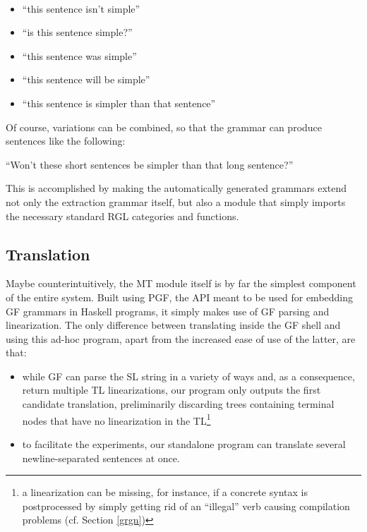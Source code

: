 \begin{example} \
    \begin{itemize}
        \item ``this sentence isn't simple''
        \item ``is this sentence simple?''
        \item ``this sentence was simple''
        \item ``this sentence will be simple''
        \item ``this sentence is simpler than that sentence''
    \end{itemize}
\end{example}

Of course, variations can be combined, so that the grammar can produce sentences like the following:

\begin{example}
    ``Won't these short sentences be simpler than that long sentence?''
\end{example}

This is accomplished by making the automatically generated grammars extend not only the extraction grammar itself, but also a module that simply imports the necessary standard RGL categories and functions.

\subsection{Translation} \label{mt}
Maybe counterintuitively, the MT module itself is by far the simplest component of the entire system. Built using PGF, the API meant to be used for embedding GF grammars in Haskell programs, it simply makes use of GF parsing and linearization.
The only difference between translating inside the GF shell and using this ad-hoc program, apart from the increased ease of use of the latter, are that: \smallskip

\begin{itemize}
    \item while GF can parse the SL string in a variety of ways and, as a consequence, return multiple TL linearizations, our program only outputs the first candidate translation, preliminarily discarding trees containing terminal nodes that have no linearization in the TL\footnote{a linearization can be missing, for instance, if a concrete syntax is postprocessed by simply getting rid of an ``illegal'' verb causing compilation problems (cf. Section \ref{grgn})} 
    \item to facilitate the experiments, our standalone program can translate several newline-separated sentences at once.
\end{itemize}

